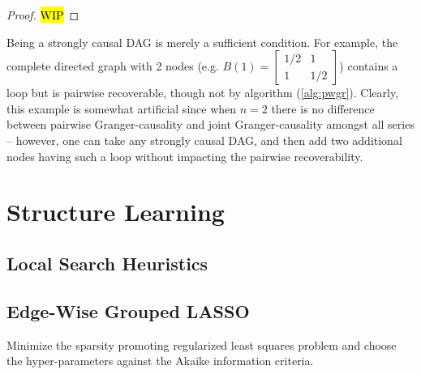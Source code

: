 \documentclass[12pt]{article}
\def\gcg{\mathcal{G}}  %
\newcommand{\pa}[1]{pa(#1)}  %
\newcommand{\anc}[1]{\mathcal{A}(#1)}  %
\begin{document}
\begin{proof}




\hl{WIP}
\end{proof}

\begin{example}
  Being a strongly causal DAG is merely a sufficient condition.  For example, the complete directed graph with 2 nodes (e.g. $B(1) = \left[ \begin{array}{cc} 1/2 & 1 \\ 1 & 1/2 \end{array} \right]$) contains a loop but is pairwise recoverable, though not by algorithm (\ref{alg:pwgr}).  Clearly, this example is somewhat artificial since when $n = 2$ there is no difference between pairwise Granger-causality and joint Granger-causality amongst all series -- however, one can take any strongly causal DAG, and then add two additional nodes having such a loop without impacting the pairwise recoverability.
\end{example}

\section{Structure Learning}
\label{sec:structure_learning}
\subsection{Local Search Heuristics}


\subsection{Edge-Wise Grouped LASSO}
Minimize the sparsity promoting regularized least squares problem and choose the hyper-parameters against the Akaike information criteria.
\end{document}
